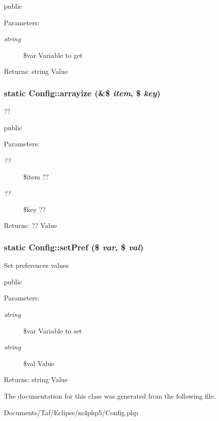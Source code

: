 public \begin{Desc}
\item[Parameters:]
\begin{description}
\item[{\em string}]\$var Variable to get \end{description}
\end{Desc}
\begin{Desc}
\item[Returns:]string Value \end{Desc}
\hypertarget{classConfig_c3a31a273309242bd21578c108ad550c}{
\subsubsection[arrayize]{\setlength{\rightskip}{0pt plus 5cm}static Config::arrayize (\&\$ {\em item}, \/  \$ {\em key})}}
\label{classConfig_c3a31a273309242bd21578c108ad550c}


??

public \begin{Desc}
\item[Parameters:]
\begin{description}
\item[{\em ??}]\$item ?? \item[{\em ??}]\$key ?? \end{description}
\end{Desc}
\begin{Desc}
\item[Returns:]?? Value \end{Desc}
\hypertarget{classConfig_65cd0982a67c8f58c0fe788d65862ac7}{
\subsubsection[setPref]{\setlength{\rightskip}{0pt plus 5cm}static Config::setPref (\$ {\em var}, \/  \$ {\em val})}}
\label{classConfig_65cd0982a67c8f58c0fe788d65862ac7}


Set preferences values

public \begin{Desc}
\item[Parameters:]
\begin{description}
\item[{\em string}]\$var Variable to set \item[{\em string}]\$val Value \end{description}
\end{Desc}
\begin{Desc}
\item[Returns:]string Value \end{Desc}


The documentation for this class was generated from the following file:\begin{CompactItemize}
\item 
Documents/Taf/Eclipse/m4php5/Config.php\end{CompactItemize}
